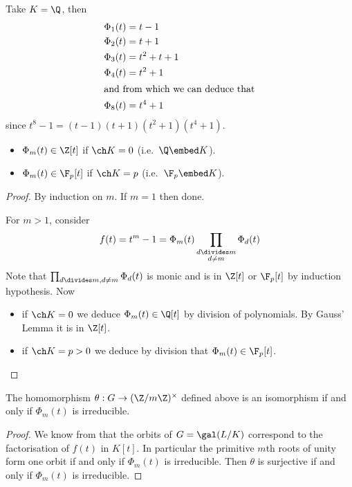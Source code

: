 \documentclass[a4paper]{article}
\begin{document}
\begin{eg}
  Take \(K = \Q\), then
  \begin{align*}
    \Phi_1(t) &= t - 1 \\
    \Phi_2(t) &= t + 1 \\
    \Phi_3(t) &= t^2 + t + 1 \\
    \Phi_4(t) &= t^2 + 1 \\
    \intertext{and from which we can deduce that}
    \Phi_8(t) &= t^4 + 1
  \end{align*}
  since \(t^8 - 1 = (t - 1)(t + 1)(t^2 + 1)(t^4 + 1)\).
\end{eg}

\begin{lemma}\leavevmode
  \begin{itemize}
  \item \(\Phi_m(t) \in \Z[t]\) if \(\ch K = 0\) (i.e.\ \(\Q \embed K\)).
  \item \(\Phi_m(t) \in \F_p[t]\) if \(\ch K = p\) (i.e.\ \(\F_p \embed K\)).
  \end{itemize}
\end{lemma}

\begin{proof}
  By induction on \(m\). If \(m = 1\) then done.

  For \(m > 1\), consider
  \[
    f(t) = t^m - 1 =\Phi_m(t) \prod_{\substack{d \divides m \\ d \neq m}} \Phi_d(t)
  \]
  Note that \(\prod_{d \divides m, d \neq m} \Phi_d(t)\) is monic and is in \(\Z[t]\) or \(\F_p[t]\) by induction hypothesis. Now
  \begin{itemize}
  \item if \(\ch K = 0\) we deduce \(\Phi_m(t) \in \Q[t]\) by division of polynomials. By Gauss' Lemma it is in \(\Z[t]\).
  \item if \(\ch K = p > 0\) we deduce by division that \(\Phi_m(t) \in \F_p[t]\).
  \end{itemize}
\end{proof}

\begin{lemma}
  \label{lem:irreducibility of cyclotomic}
  The homomorphism \(\theta: G \to (\Z/m\Z)^\times\) defined above is an isomorphism if and only if \(\Phi_m(t)\) is irreducible.
\end{lemma}

\begin{proof}
  We know from  that the orbits of \(G = \gal(L/K)\) correspond to the factorisation of \(f(t)\) in \(K[t]\). In particular the primitive \(m\)th roots of unity form one orbit if and only if \(\Phi_m(t)\) is irreducible. Then \(\theta\) is surjective if and only if \(\Phi_m(t)\) is irreducible.
\end{proof}
\end{document}
